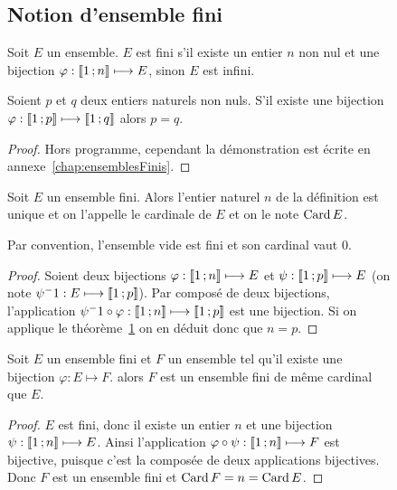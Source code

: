 \begin{figure}
\subsection{Notion d'ensemble fini}

\begin{defdef}
  Soit \(E\) un ensemble. \(E\) est fini s'il existe un entier \(n\) non nul et une bijection \(\varphi:\mathopen{\llbracket}1\mathclose{}\mathpunct{};n\mathclose{\rrbracket} \longmapsto E\), sinon \(E\) est infini.
\end{defdef}
\begin{theo}\label{theo:ensemblefini}
  Soient \(p\) et \(q\) deux entiers naturels non nuls. S'il existe une bijection \(\varphi:\mathopen{\llbracket}1\mathclose{}\mathpunct{};p\mathclose{\rrbracket} \longmapsto \mathopen{\llbracket}1\mathclose{}\mathpunct{};q\mathclose{\rrbracket}\) alors \(p=q\).
\end{theo}
\begin{proof}
  Hors programme, cependant la démonstration est écrite en annexe~\ref{chap:ensemblesFinis}.
\end{proof}
\begin{prop}[Définition]
  Soit \(E\) un ensemble fini. Alors l'entier naturel \(n\) de la définition est unique et on l'appelle le cardinale de \(E\) et on le note \(\operatorname{Card} E\).
\end{prop}
Par convention, l'ensemble vide est fini et son cardinal vaut \(0\).
\begin{proof}
  Soient deux bijections \(\varphi:\mathopen{\llbracket}1\mathclose{}\mathpunct{};n\mathclose{\rrbracket} \longmapsto E\) et \(\psi:\mathopen{\llbracket}1\mathclose{}\mathpunct{};p\mathclose{\rrbracket} \longmapsto E\) (on note \(\psi^-1:E \longmapsto \mathopen{\llbracket}1\mathclose{}\mathpunct{};p\mathclose{\rrbracket}\)). Par composé de deux bijections, l'application \(\psi^-1\circ \varphi: \mathopen{\llbracket}1\mathclose{}\mathpunct{};n\mathclose{\rrbracket} \longmapsto \mathopen{\llbracket}1\mathclose{}\mathpunct{};p\mathclose{\rrbracket}\) est une bijection. Si on applique le théorème~\ref{theo:ensemblefini} on en déduit donc que \(n=p\).
\end{proof}
\begin{prop}
  Soit \(E\) un ensemble fini et \(F\) un ensemble tel qu'il existe une bijection \(\varphi:E\longmapsto F\). alors \(F\) est un ensemble fini de même cardinal que \(E\).
\end{prop}
\begin{proof}
  \(E\) est fini, donc il existe un entier \(n\) et une bijection \(\psi:\mathopen{\llbracket}1\mathclose{}\mathpunct{};n\mathclose{\rrbracket} \longmapsto E\). Ainsi l'application \(\varphi\circ\psi:\mathopen{\llbracket}1\mathclose{}\mathpunct{};n\mathclose{\rrbracket} \longmapsto F\) est bijective, puisque c'est la composée de deux applications bijectives. Donc \(F\) est un ensemble fini et \(\operatorname{Card} F=n=\operatorname{Card} E\).
\end{proof}


\end{figure}
